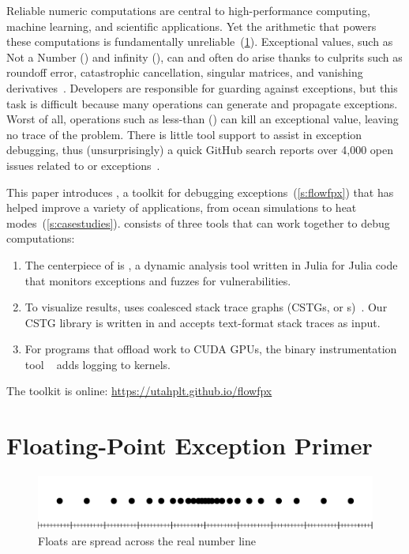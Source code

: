 \documentclass{juliacon}
\begin{document}
Reliable numeric computations are central to high-performance computing,
machine learning, and scientific applications.
Yet the \fp{} arithmetic that powers these computations is fundamentally
unreliable~(\cref{s:background}).
Exceptional values, such as Not a Number (\Nan{}) and infinity (\Inf{}),
can and often do arise thanks to culprits such as roundoff error,
catastrophic cancellation, singular matrices, and vanishing
derivatives~\cite{bllmg-xloop-2022,ddghlllprr-correctness-2022,fpchecker-reports,gllprt-correctness-2021,llg-soap-2022,sdjmrstp-pc-2022}.
Developers are responsible for guarding against exceptions, but this task
is difficult because many operations can generate and propagate exceptions.
Worst of all, operations such as less-than (\code{<}) can kill an exceptional value,
leaving no trace of the problem.
There is little tool support to assist in exception debugging,
thus (unsurprisingly) a quick GitHub search reports over 4,000 open issues
related to \NaN{} or \Inf{} exceptions~\cite{github-issues}.

This paper introduces \FlowFPX{}, a toolkit for debugging
\fp{} exceptions~(\cref{s:flowfpx})
that has helped improve a variety of applications,
from ocean simulations to heat modes~(\cref{s:casestudies}).
\FlowFPX{} consists of three tools that can work together to debug \fp{} computations:
\begin{enumerate}
  \item
    The centerpiece of \FlowFPX{} is \TF{}, a dynamic analysis tool written in Julia
    for Julia code that monitors exceptions and fuzzes for vulnerabilities.
  \item
    To visualize results, \FlowFPX{} uses coalesced stack trace graphs (CSTGs, or
    \CSTG{}s)~\cite{humphreySystematicDebuggingMethods2014}.
    Our CSTG library is written in \CPP{} and accepts text-format stack traces as input.
  \item
    For programs that offload work to CUDA GPUs,
    the binary instrumentation tool \GPUFPX{}~\cite{llsflg-hpdc-2023}
    adds logging to kernels.
\end{enumerate}

\noindent%
The toolkit is online: \url{https://utahplt.github.io/flowfpx}


\section{Floating-Point Exception Primer}
\label{s:background}

\begin{figure}[t]\centering
  \includegraphics[trim=10 0 10 0,clip,width=0.95\columnwidth]{fig/real_vs_fp.pdf}
  \caption{Floats are spread across the real number line}
  \label{f:real-vs-fp}
\end{figure}
\end{document}
